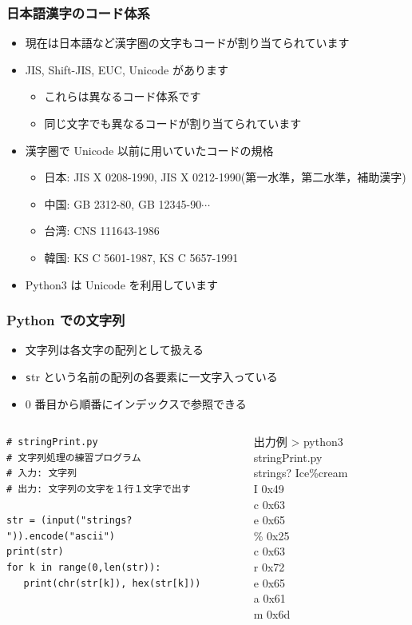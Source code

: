 \begin{frame}
\frametitle{日本語漢字のコード体系}
  \begin{itemize}
\item 現在は日本語など漢字圏の文字もコードが割り当てられています
\item JIS, Shift-JIS, EUC, Unicode があります
    \begin{itemize}
\item これらは異なるコード体系です
\item 同じ文字でも異なるコードが割り当てられています
    \end{itemize}
\item 漢字圏で Unicode 以前に用いていたコードの規格
    \begin{itemize}
\item 日本: JIS X 0208-1990, JIS X 0212-1990(第一水準，第二水準，補助漢字)
\item 中国: GB 2312-80, GB 12345-90$\cdots$
\item 台湾: CNS 111643-1986
\item 韓国: KS C 5601-1987, KS C 5657-1991
    \end{itemize}
\item Python3 は Unicode を利用しています
  \end{itemize}
\end{frame}
\begin{frame}
\frametitle{Python での文字列}
  \begin{itemize}
\item 文字列は各文字の配列として扱える
\item {\texttt str} という名前の配列の各要素に一文字入っている
\item 0 番目から順番にインデックスで参照できる
  \end{itemize}
  \begin{columns}
    \begin{column}{0.5\textwidth}
      \begin{lstlisting}[caption={stringPrint.py},label=lst:strprt]
# stringPrint.py
# 文字列処理の練習プログラム
# 入力: 文字列
# 出力: 文字列の文字を１行１文字で出す

str = (input("strings? ")).encode("ascii")
print(str)
for k in range(0,len(str)):
   print(chr(str[k]), hex(str[k]))
      \end{lstlisting}
    \end{column}
    \begin{column}{0.4\textwidth}
      \begin{itembox}{出力例}
\scriptsize
> python3 stringPrint.py\\
strings? Ice\%cream\\
I 0x49\\
c 0x63\\
e 0x65\\
\% 0x25\\
c 0x63\\
r 0x72\\
e 0x65\\
a 0x61\\
m 0x6d
      \end{itembox}
    \end{column}
  \end{columns}
\end{frame}
